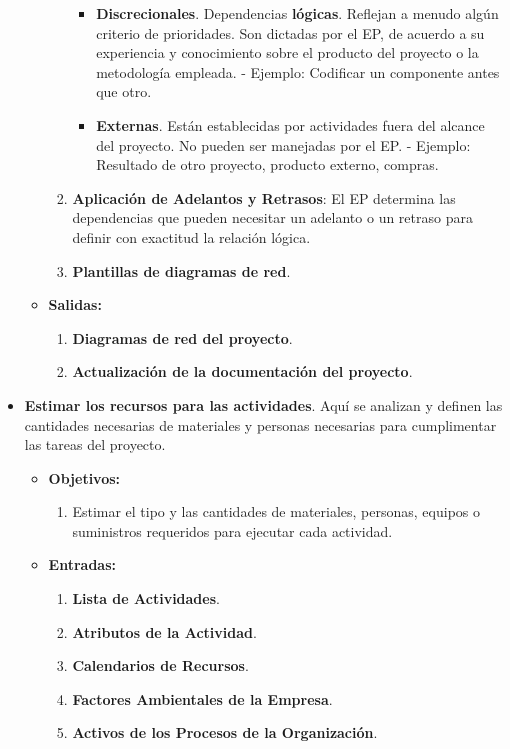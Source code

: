 \documentclass[10pt,a4paper]{article}
\begin{document}
\begin{itemize}
\begin{itemize}
\begin{enumerate}
\begin{itemize}
\item \textbf{Discrecionales}.
Dependencias \textbf{lógicas}. Reflejan a menudo algún criterio de
prioridades. Son dictadas por el EP, de acuerdo a su experiencia y conocimiento sobre el producto del proyecto o la metodología empleada.
\subitem - Ejemplo: Codificar un componente antes que otro.

\item \textbf{Externas}.
Están establecidas por actividades fuera del alcance del proyecto. No
pueden ser manejadas por el EP.
\subitem - Ejemplo: Resultado de otro proyecto, producto externo, compras.
\end{itemize}
\item \textbf{Aplicación de Adelantos y Retrasos}: El EP determina las dependencias que pueden necesitar un adelanto o un retraso para definir con exactitud la relación lógica.
\item \textbf{Plantillas de diagramas de red}.
\end{enumerate}

\item \textbf{Salidas:}
\begin{enumerate}
\item \textbf{Diagramas de red del proyecto}.
\item \textbf{Actualización de la documentación del proyecto}.
\end{enumerate}
\end{itemize}

\item \textbf{Estimar los recursos para las actividades}. Aquí se analizan y definen las cantidades necesarias de materiales y personas necesarias para cumplimentar las tareas del proyecto.

\begin{itemize}
\item \textbf{Objetivos:}
\begin{enumerate}
\item Estimar el tipo y las cantidades de materiales, personas, equipos o suministros requeridos para ejecutar cada actividad.
\end{enumerate}

\item \textbf{Entradas:}
\begin{enumerate}
\item \textbf{Lista de Actividades}.
\item \textbf{Atributos de la Actividad}.
\item \textbf{Calendarios de Recursos}.
\item \textbf{Factores Ambientales de la Empresa}.
\item \textbf{Activos de los Procesos de la Organización}.
\end{enumerate}


\end{itemize}
\end{itemize}
\end{document}
